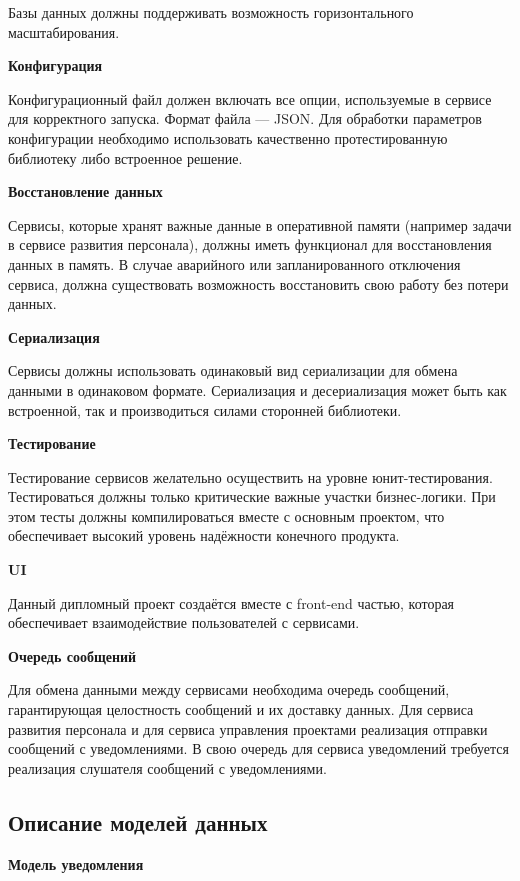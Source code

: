 Базы данных должны поддерживать возможность горизонтального масштабирования.

\bigskip
\textbf{Конфигурация}

Конфигурационный файл должен включать все опции, используемые в сервисе для корректного запуска. Формат файла — JSON. Для обработки параметров конфигурации необходимо использовать качественно протестированную библиотеку либо встроенное решение.

\bigskip
\textbf{Восстановление данных}

Сервисы, которые хранят важные данные в оперативной памяти (например задачи в сервисе развития персонала), должны иметь функционал для восстановления данных в память. В случае аварийного или запланированного отключения сервиса, должна существовать возможность восстановить свою работу без потери данных.

\bigskip
\textbf{Сериализация}

Сервисы должны использовать одинаковый вид сериализации для обмена данными в одинаковом формате. Сериализация и десериализация может быть как встроенной, так и производиться силами сторонней библиотеки.

\bigskip
\textbf{Тестирование}

Тестирование сервисов желательно осуществить на уровне юнит-тести\-рования. Тестироваться должны только критические важные участки бизнес-логики. При этом тесты должны компилироваться вместе с основным проектом, что обеспечивает высокий уровень надёжности конечного продукта.

\bigskip
\textbf{UI}

Данный дипломный проект создаётся вместе с front-end частью, которая обеспечивает взаимодействие пользователей с сервисами.

\bigskip
\textbf{Очередь сообщений}

Для обмена данными между сервисами необходима очередь сообщений, гарантирующая целостность сообщений и их доставку данных. Для сервиса развития персонала и для сервиса управления проектами реализация отправки сообщений с уведомлениями. В свою очередь для сервиса уведомлений требуется реализация слушателя сообщений с уведомлениями.

\subsection{Описание моделей данных}\label{sec:domain:models}

\textbf{Модель уведомления}

